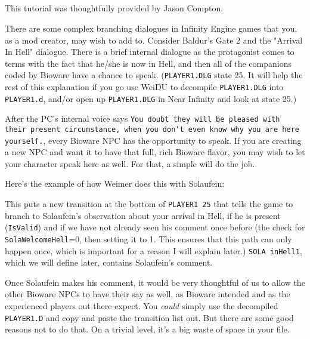\documentclass{article}
\def\ttref#1{\ahrefloc{#1}{\tt #1}}
\def\t#1{{\tt #1}}
\begin{document}
\subsection{\ttref{COPY!TRANS}}

This tutorial was thoughtfully provided by Jason Compton.

There are some complex branching dialogues in Infinity Engine games that
you, as a mod creator, may wish to add to. Consider Baldur's Gate 2 and the
"Arrival In Hell" dialogue. There is a brief internal dialogue as the
protagonist comes to terms with the fact that he/she is now in Hell, and
then all of the companions coded by Bioware have a chance to speak.
(\t{PLAYER1.DLG} state 25. It will help the rest of this explanation if you
go use WeiDU to decompile \t{PLAYER1.DLG} into \t{PLAYER1.d}, and/or open
up \t{PLAYER1.DLG} in Near Infinity and look at state 25.)

After the PC's internal voice says \t{You doubt they will be pleased with
their present circumstance, when you don't even know why you are here
yourself.}, every Bioware NPC has the opportunity to speak. If you are
creating a new NPC and want it to have that full, rich Bioware flavor, you
may wish to let your character speak here as well. For that, a simple
\ttref{EXTEND!BOTTOM} will do the job.

Here's the example of how Weimer does this with Solaufein:
This puts a new transition at the bottom of \t{PLAYER1 25} that tells the
game to branch to Solaufein's observation about your arrival in Hell, if he
is present (\t{IsValid}) and if we have not already seen his comment once
before (the check for \t{SolaWelcomeHell}=0, then setting it to 1. This
ensures that this path can only happen once, which is important for a
reason I will explain later.) \t{SOLA inHell1}, which we will define later,
contains Solaufein's comment.

Once Solaufein makes his comment, it would be very thoughtful of us to
allow the other Bioware NPCs to have their say as well, as Bioware intended
and as the experienced players out there expect. You {\em could} simply use the
decompiled \t{PLAYER1.D} and copy and paste the transition list out. But
there are some good reasons not to do that. On a trivial level, it's a big
waste of space in your \ttref{D} file.
\end{document}
